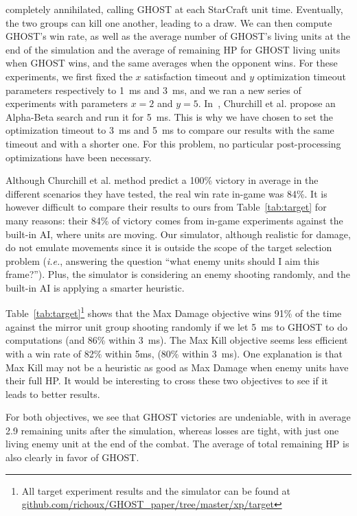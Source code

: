 \documentclass[journal]{IEEEtran}
\newcommand{\ghost}{\textsc{GHOST}\xspace}
\newcommand{\ie}{\textit{i.e.}}
\begin{document}
completely  annihilated,   calling  \ghost  at  each   StarCraft  unit
time. Eventually,  the two groups can  kill one another, leading  to a
draw. We  can then compute \ghost's  win rate, as well  as the average
number of \ghost's  living units at the end of  the simulation and the
average of remaining HP for \ghost  living units when \ghost wins, and
the same  averages when the  opponent wins. For these  experiments, we
first fixed the $x$ satisfaction  timeout and $y$ optimization timeout
parameters respectively  to 1~ms and  3~ms, and we  ran a new  series of
experiments with parameters  $x=2$ and $y=5$.  In~\cite{ChurchillSB12,
  ChurchillB12}, Churchill et al. propose an Alpha-Beta search and run
it  for 5~ms.   This is  why  we have  chosen to  set the  optimization
timeout to  3~ms and 5~ms to  compare our results with  the same timeout
and   with  a   shorter  one.    For  this   problem,  no   particular
post-processing optimizations have been necessary.

Although Churchill et al. method predict a 100\% victory in average in
the different  scenarios they have  tested, the real win  rate in-game
was 84\%.   It is however difficult  to compare their results  to ours
from Table~\ref{tab:target}  for many  reasons: their 84\%  of victory
comes from  in-game experiments against  the built-in AI,  where units
are  moving. Our  simulator,  although realistic  for  damage, do  not
emulate  movements  since  it  is  outside the  scope  of  the  target
selection  problem (\ie,  answering  the question  ``what enemy  units
should I  aim this  frame?''). Plus, the  simulator is  considering an
enemy shooting  randomly, and  the built-in AI  is applying  a smarter
heuristic.

Table~\ref{tab:target}\footnote{All target experiment  results and the
  simulator            can            be           found            at
  \href{https://github.com/richoux/GHOST\_paper/tree/master/xp/target}{github.com/richoux/GHOST\_paper/tree/master/xp/target}}
shows that the Max Damage objective  wins 91\% of the time against the
mirror unit  group shooting  randomly if  we let 5~ms  to \ghost  to do
computations (and 86\% within 3~ms).  The Max Kill objective seems less
efficient with a  win rate of 82\% within 5ms,  (80\% within 3~ms). One
explanation is  that Max Kill  may not be a  heuristic as good  as Max
Damage when enemy  units have their full HP.  It  would be interesting
to cross these two objectives to see if it leads to better results.

For both objectives, we see that \ghost victories are undeniable, with
in average  2.9 remaining units  after the simulation,  whereas losses
are  tight,  with  just one  living  enemy  unit  at  the end  of  the
combat. The average of total remaining  HP is also clearly in favor of
\ghost.
\end{document}
